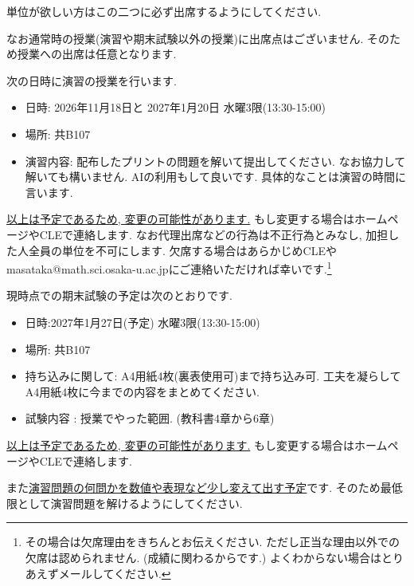 \documentclass[dvipdfmx,a4paper,11pt]{article} %
\theoremstyle{definition}
\begin{document}
単位が欲しい方はこの二つに必ず出席するようにしてください. 

なお通常時の授業(演習や期末試験以外の授業)に出席点はございません. そのため授業への出席は任意となります. 


\medskip
{}

次の日時に演習の授業を行います. 
\begin{itemize}
  \setlength{\parskip}{0cm} 
  \setlength{\itemsep}{0cm}
\item 日時: 2026年11月18日と 2027年1月20日 水曜3限(13:30-15:00)
\item 場所: 共B107
\item 演習内容: 配布したプリントの問題を解いて提出してください. なお協力して解いても構いません. AIの利用もして良いです. 具体的なことは演習の時間に言います. 
\end{itemize}
\underline{以上は予定であるため, 変更の可能性があります.} もし変更する場合はホームページやCLEで連絡します. 
なお代理出席などの行為は不正行為とみなし, 加担した人全員の単位を不可にします.
欠席する場合はあらかじめCLEやmasataka@math.sci.osaka-u.ac.jpにご連絡いただければ幸いです.\footnote{その場合は欠席理由をきちんとお伝えください. ただし正当な理由以外での欠席は認められません. (成績に関わるからです.) よくわからない場合はとりあえずメールしてください. }

\newpage
{}

現時点での期末試験の予定は次のとおりです. 
\begin{itemize}
  \setlength{\parskip}{0cm} 
  \setlength{\itemsep}{0cm}
\item 日時:2027年1月27日(予定) 水曜3限(13:30-15:00)
\item 場所: 共B107
\item 持ち込みに関して: A4用紙4枚(裏表使用可)まで持ち込み可. 工夫を凝らしてA4用紙4枚に今までの内容をまとめてください.
\item 試験内容 : 授業でやった範囲. (教科書4章から6章)
\end{itemize}

\underline{以上は予定であるため, 変更の可能性があります.} もし変更する場合はホームページやCLEで連絡します. 

また\underline{演習問題の何問かを数値や表現など少し変えて出す予定}です. そのため最低限として演習問題を解けるようにしてください. 
\end{document}
